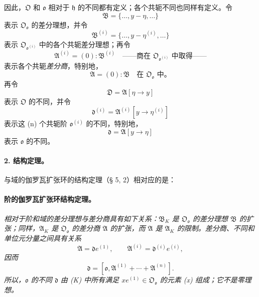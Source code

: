 因此，\(\mathfrak O\) 和 \(\mathfrak o\) 相对于 \(\mathfrak h\) 的不同都有定义；各个共轭不同也同样有定义。令
\[
\mathfrak B=\{\ldots,y-\eta,\ldots\}
\]
表示 \(\mathfrak O_{\mathfrak o}\) 的差分理想，并令
\[
\mathfrak B^{(i)}=\{\ldots,y-\eta^{(i)},\ldots\}
\]
表示 \(\mathfrak O_{\mathfrak o^{(i)}}\) 中的各个共轭差分理想；再令
\[
\mathfrak A^{(i)}=(0):\mathfrak B^{(i)}
\quad\text{——商在 \(\mathfrak O_{\mathfrak o^{(i)}}\) 中取得——}
\]
表示各个共轭\emph{差分商}，特别地，
\[
\mathfrak A=(0):\mathfrak B\quad\text{在 }\mathfrak O_{\mathfrak o}\text{ 中。}
\]
再令
\[
\mathfrak D=\mathfrak A[\eta\to y]
\]
表示 \(\mathfrak O\) 的不同，并令
\[
\mathfrak d^{(i)}=\mathfrak A^{(i)}[y\to\eta^{(i)}]
\]
表示这 (n) 个共轭阶 \(\mathfrak o^{(i)}\) 的不同，特别地，
\[
\mathfrak d=\mathfrak A[y\to\eta]
\]
表示 \(\mathfrak o\) 的不同。

\paragraph{2. 结构定理。}
与域的伽罗瓦扩张环的结构定理（§ 5, 2）相对应的是：

\paragraph{阶的伽罗瓦扩张环结构定理。}
\emph{相对于阶和域的差分理想与差分商具有如下关系：\(\mathfrak B_K\) 是 \(\mathfrak O_{\mathfrak o}\) 的差分理想 \(\mathfrak B\) 的扩张；同样，\(\mathfrak A_K\) 是 \(\mathfrak O_{\mathfrak o}\) 的差分商 \(\mathfrak A\) 的扩张，而 \(\mathfrak A\) 是 \(\mathfrak A_K\) 的限制。差分商、不同和单位元分量之间具有关系}
\[
\mathfrak A=\mathfrak d e^{(1)},
\qquad
\mathfrak A^{(i)}=\mathfrak d^{(i)}e^{(i)},
\]
\emph{因而}
\[
\mathfrak d=[\mathfrak o,\mathfrak A^{(1)}+\cdots+\mathfrak A^{(n)}].
\]
\emph{所以，\(\mathfrak o\) 的不同 \(\mathfrak d\) 由 (K) 中所有满足 \(xe^{(1)}\in\mathfrak O_{\mathfrak o}\) 的元素 (x) 组成；它不是零理想。}

